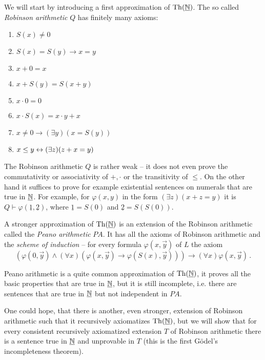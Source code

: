 We will start by introducing a first approximation of $\operatorname{Th}(\underline{\mathbb{N}})$. The so called \emph{Robinson arithmetic} $Q$ has finitely many axioms:
\begin{multicols}{2}
\begin{enumerate}
  \item $S(x) \neq 0$
  \item $S(x) = S(y) \to x = y$
  \item $x + 0 = x$
  \item $x + S(y) = S(x+y)$
  \columnbreak
  \item $x \cdot 0 = 0$
  \item $x \cdot S(x) = x \cdot y + x$
  \item $x \neq 0 \to (\exists y)(x = S(y))$
  \item $x \leq y \leftrightarrow (\exists z)(z +x = y)$
\end{enumerate}
\end{multicols}

The Robinson arithmetic $Q$ is rather weak -- it does not even prove the commutativity or associativity of $+,\cdot$ or the transitivity of $\leq$. On the other hand it suffices to prove for example existential sentences on numerals that are true in $\underline{\mathbb{N}}$. For example, for $\varphi(x,y)$ in the form $(\exists z)(x+z=y)$ it is $Q \vdash \varphi(\underline{1}, \underline{2})$, where $\underline{1} = S(0)$ and $\underline{2} = S(S(0))$.

A stronger approximation of $\operatorname{Th}(\underline{\mathbb{N}})$ is an extension of the Robinson arithmetic called the \emph{Peano arithmetic} $PA$. It has all the axioms of Robinson arithmetic and the \emph{scheme of induction} -- for every formula $\varphi(x, \vec{y})$ of $L$ the axiom $$(\varphi(0, \vec{y}) \land (\forall x)(\varphi(x, \vec{y}) \to \varphi(S(x), \vec{y}))) \to (\forall x)\varphi(x, \vec{y})\,.$$

Peano arithmetic is a quite common approximation of $\operatorname{Th}(\underline{\mathbb{N}})$, it proves all the basic properties that are true in $\underline{\mathbb{N}}$, but it is still incomplete, i.e. there are sentences that are true in $\underline{\mathbb{N}}$ but not independent in $PA$. 

One could hope, that there is another, even stronger, extension of Robinson arithmetic such that it recursively axiomatizes $\operatorname{Th}(\underline{\mathbb{N}})$, but we will show that for every consistent recursively axiomatized extension $T$ of Robinson arithmetic there is a sentence true in $\underline{\mathbb{N}}$ and unprovable in $T$ (this is the first Gödel's incompleteness theorem).

